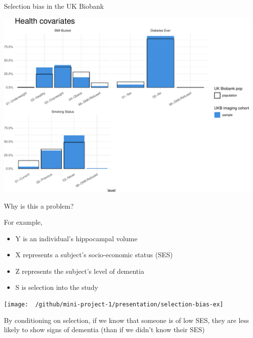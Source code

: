 \documentclass[
  ignorenonframetext,
]{beamer}
\providecommand{\tightlist}{%
  \setlength{\itemsep}{0pt}\setlength{\parskip}{0pt}}
\begin{document}
\begin{frame}{Selection bias in the UK Biobank}
\protect\hypertarget{selection-bias-in-the-uk-biobank-1}{}

\begin{center}\includegraphics[width=0.95\linewidth]{fmrib-deck-20191002_files/figure-beamer/plot-selection-bias-health-1} \end{center}

\end{frame}

\begin{frame}{Why is this a problem?}
\protect\hypertarget{why-is-this-a-problem}{}

For example,

\begin{itemize}
\tightlist
\item
  Y is an individual's hippocampal volume
\item
  X represents a subject's socio-economic status (SES)
\item
  Z represents the subject's level of dementia
\item
  S is selection into the study
\end{itemize}

\center

\texttt{[image: ~/github/mini-project-1/presentation/selection-bias-ex]}
\center

By conditioning on selection, if we know that someone is of low SES,
they are less likely to show signs of dementia (than if we didn't know
their SES)

\end{frame}
\end{document}
